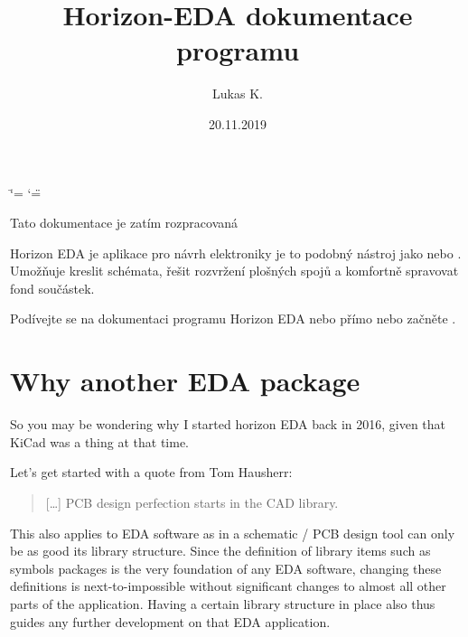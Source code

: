 \documentclass[letterpaper,10pt,czech]{sphinxmanual}
\title{Horizon-EDA dokumentace programu}
\date{20.11.2019}
\author{Lukas K.}
\begin{document}
\ifdefined\shorthandoff
  \ifnum\catcode`\=\string=\active\shorthandoff{=}\fi
  \ifnum\catcode`\"=\active{}\fi
\fi

\pagestyle{empty}
\sphinxmaketitle
\pagestyle{plain}
\sphinxtableofcontents
\pagestyle{normal}
\label{\detokenize{index::doc}}


Tato dokumentace je zatím rozpracovaná

Horizon EDA je aplikace pro návrh elektroniky  je to podobný nástroj jako  nebo . Umožňuje kreslit schémata, řešit rozvržení plošných spojů a komfortně spravovat fond součástek.

Podívejte se na dokumentaci programu Horizon EDA {\hyperref[\detokenize{feature-overview::doc}]{}} nebo přímo {\hyperref[\detokenize{installation::doc}]{}} nebo začněte {\hyperref[\detokenize{why-another-eda-package::doc}]{}}.

\noindent{}


\chapter{Why another EDA package}
\label{\detokenize{why-another-eda-package:why-another-eda-package}}\label{\detokenize{why-another-eda-package::doc}}
So you may be wondering why I started horizon EDA back in 2016, given
that KiCad was a thing at that time.

Let’s get started with a quote from Tom Hausherr: 
\begin{quote}

{[}…{]} PCB design perfection starts in the CAD library.
\end{quote}

This also applies to EDA software as in a schematic / PCB design tool
can only be as good its library structure. Since the definition of
library items such as symbols packages is the very foundation of any
EDA software, changing these definitions is next-to-impossible without
significant changes to almost all other parts of the application.
Having a certain library structure in place also thus guides any further
development on that EDA application.
\end{document}
